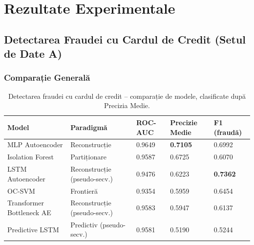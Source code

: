 \chapter{Rezultate Experimentale}
\label{ch:results}


\section{Detectarea Fraudei cu Cardul de Credit (Setul de Date A)}

\subsection{Comparație Generală}

\begin{table}[h]
\centering
\footnotesize
\begin{tabular}{@{}lllll@{}}
\toprule
Model & Paradigmă & ROC-AUC & Precizie Medie & F1 (fraudă) \\
\midrule
MLP Autoencoder            & Reconstrucție              & 0.9649 & \textbf{0.7105} & 0.6992 \\
Isolation Forest           & Partiționare                   & 0.9587 & 0.6725          & 0.6070 \\
LSTM Autoencoder           & Reconstrucție (pseudo-secv.) & 0.9476 & 0.6223          & \textbf{0.7362} \\
OC-SVM                     & Frontieră                     & 0.9354 & 0.5959          & 0.6454 \\
Transformer Bottleneck AE  & Reconstrucție (pseudo-secv.) & 0.9583 & 0.5947          & 0.6137 \\
Predictive LSTM            & Predictiv (pseudo-secv.)     & 0.9581 & 0.5190          & 0.5244 \\
\bottomrule
\end{tabular}
\caption{Detectarea fraudei cu cardul de credit -- comparație de modele, clasificate după Precizia Medie.}
\label{tab:cc-results}
\end{table}

